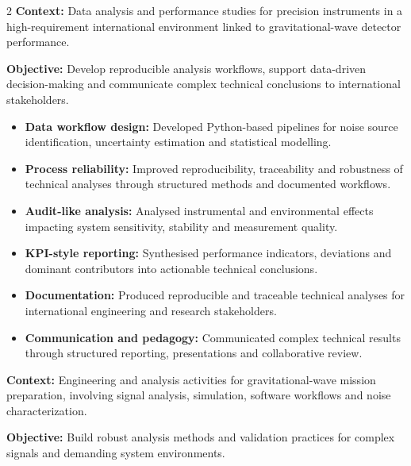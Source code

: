 \documentclass[8pt,a4paper,ragged2e,withhyper]{altacv}
\begin{document}
\begin{paracol}{2}
\textbf{Context:} Data analysis and performance studies for precision instruments in a high-requirement international environment linked to gravitational-wave detector performance.

\textbf{Objective:} Develop reproducible analysis workflows, support data-driven decision-making and communicate complex technical conclusions to international stakeholders.

\begin{itemize}
  \item \textbf{Data workflow design:} Developed Python-based pipelines for noise source identification, uncertainty estimation and statistical modelling.
  \item \textbf{Process reliability:} Improved reproducibility, traceability and robustness of technical analyses through structured methods and documented workflows.
  \item \textbf{Audit-like analysis:} Analysed instrumental and environmental effects impacting system sensitivity, stability and measurement quality.
  \item \textbf{KPI-style reporting:} Synthesised performance indicators, deviations and dominant contributors into actionable technical conclusions.
  \item \textbf{Documentation:} Produced reproducible and traceable technical analyses for international engineering and research stakeholders.
  \item \textbf{Communication and pedagogy:} Communicated complex technical results through structured reporting, presentations and collaborative review.
\end{itemize}

\divider


\textbf{Context:} Engineering and analysis activities for gravitational-wave mission preparation, involving signal analysis, simulation, software workflows and noise characterization.

\textbf{Objective:} Build robust analysis methods and validation practices for complex signals and demanding system environments.


\end{paracol}
\end{document}

